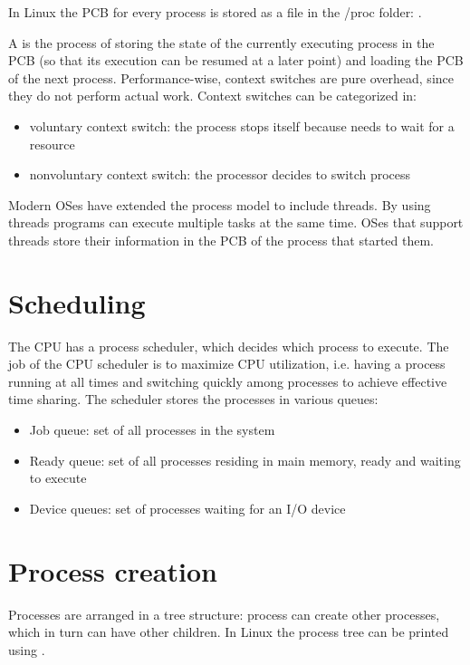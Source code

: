 In Linux the PCB for every process is stored as a file in the /proc folder: .

A  is the process of storing the state of the currently executing process in the PCB (so that its execution can be resumed at a later point) and loading the PCB of the next process. Performance-wise, context switches are pure overhead, since they do not perform actual work. Context switches can be categorized in:

\begin{itemize}
  \item voluntary context switch: the process stops itself because needs to wait for a resource
  \item nonvoluntary context switch: the processor decides to switch process
\end{itemize}


Modern OSes have extended the process model to include threads. By using threads programs can execute multiple tasks at the same time. OSes that support threads store their information in the PCB of the process that started them.

\section{Scheduling}
The CPU has a process scheduler, which decides which process to execute. The job of the CPU scheduler is to maximize CPU utilization, i.e. having a process running at all times and switching quickly among processes to achieve effective time sharing. The scheduler stores the processes in various queues:

\begin{itemize}
  \item Job queue: set of all processes in the system
  \item Ready queue: set of all processes residing in main memory, ready and waiting to execute
  \item Device queues: set of processes waiting for an I/O device
\end{itemize}


\section{Process creation}
Processes are arranged in a tree structure: process can create other  processes, which in turn can have other children. In Linux the process tree can be printed using .

